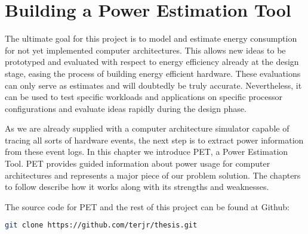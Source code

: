 \chapter{Building a Power Estimation Tool}

The ultimate goal for this project is to model and estimate energy consumption
for not yet implemented computer architectures. This allows new ideas to be
prototyped and evaluated with respect to energy efficiency already at the design
stage, easing the process of building energy efficient hardware. These
evaluations can only serve as estimates and will doubtedly be truly accurate.
Nevertheless, it can be used to test specific workloads and applications on
specific processor configurations and evaluate ideas rapidly during the design
phase.

As we are already supplied with a computer architecture simulator capable of
tracing all sorts of hardware events, the next step is to extract power
information from these event logs. In this chapter we introduce PET, a Power
Estimation Tool. PET provides guided information about power usage for computer
architectures and represents a major piece of our problem solution. The chapters
to follow describe how it works along with its strengths and weaknesses.

\noindent The source code for PET and the rest of this project can be found at
Github:
\begin{lstlisting}[language=bash,numbers=none]
git clone https://github.com/terjr/thesis.git
\end{lstlisting}






